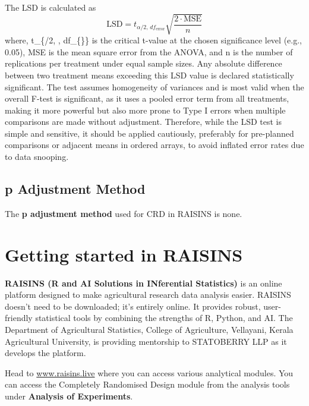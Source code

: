 \documentclass[
  letterpaper,
  DIV=11,
  numbers=noendperiod]{scrartcl}
\begin{document}
The LSD is calculated as \[
\text{LSD} = t_{\alpha/2, \, df_{\text{error}}} \sqrt{\frac{2 \cdot \text{MSE}}{n}}
\] where, t\_\{\alpha/2, , df\_\{\}\} is the critical
t-value at the chosen significance level (e.g., 0.05), MSE is the mean
square error from the ANOVA, and n is the number of replications per
treatment under equal sample sizes. Any absolute difference between two
treatment means exceeding this LSD value is declared statistically
significant. The test assumes homogeneity of variances and is most valid
when the overall F-test is significant, as it uses a pooled error term
from all treatments, making it more powerful but also more prone to Type
I errors when multiple comparisons are made without adjustment.
Therefore, while the LSD test is simple and sensitive, it should be
applied cautiously, preferably for pre-planned comparisons or adjacent
means in ordered arrays, to avoid inflated error rates due to data
snooping.

\hypertarget{sec-padjustment}{%
\subsection{p Adjustment Method}\label{sec-padjustment}}

The \textbf{p adjustment method} used for CRD in RAISINS is none.

\hypertarget{sec-raisins}{%
\section{Getting started in RAISINS}\label{sec-raisins}}

\textbf{RAISINS (R and AI Solutions in INferential Statistics)} is an
online platform designed to make agricultural research data analysis
easier. RAISINS doesn't need to be downloaded; it's entirely online. It
provides robust, user-friendly statistical tools by combining the
strengths of R, Python, and AI. The Department of Agricultural
Statistics, College of Agriculture, Vellayani, Kerala Agricultural
University, is providing mentorship to STATOBERRY LLP as it develops the
platform.

Head to \href{https://www.raisins.live/}{www.raisins.live} where you can
access various analytical modules. You can access the Completely
Randomised Design module from the analysis tools under \textbf{Analysis
of Experiments}.
\end{document}

